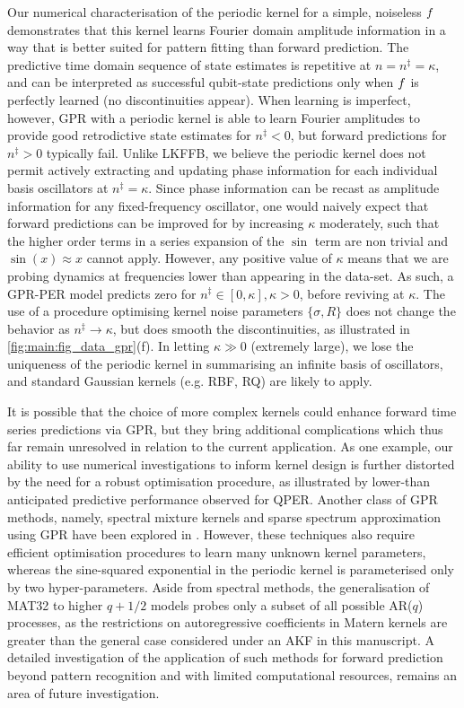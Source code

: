 Our numerical characterisation of the periodic kernel for a simple, noiseless $f$ demonstrates that this kernel learns Fourier domain amplitude information in a way that is better suited for pattern fitting than forward prediction. The predictive time domain sequence of state estimates is repetitive at $ n=n^\ddagger= \kappa$, and can be interpreted as successful qubit-state predictions only when $f$ is perfectly learned (no discontinuities appear). When learning is imperfect, however, GPR with a periodic kernel is able to learn Fourier amplitudes to provide good retrodictive state estimates for $n^\ddagger<0$, but forward predictions for $n^\ddagger>0$ typically fail.  Unlike LKFFB, we believe the periodic kernel does not permit actively extracting and updating phase information for each individual basis oscillators at $n^\ddagger= \kappa$.  Since phase information can be recast as amplitude information for any fixed-frequency oscillator, one would naively expect that forward predictions can be improved for by increasing $\kappa$ moderately, such that the higher order terms in a series expansion of the $\sin$ term are non trivial and $\sin(x)\approx x$ cannot apply. However, any positive value of $\kappa$ means that we are probing dynamics at frequencies lower than appearing in the data-set. As such, a GPR-PER model predicts zero for $n^\ddagger \in [0, \kappa], \kappa > 0$, before reviving at $\kappa$.  The use of a procedure optimising kernel noise parameters $\{\sigma, R\}$ does not change the behavior as $ n^\ddagger \to\kappa$, but does smooth the discontinuities, as illustrated in \cref{fig:main:fig_data_gpr}(f). In letting $\kappa \gg 0$ (extremely large), we lose the uniqueness of the periodic kernel in summarising an infinite basis of oscillators, and standard Gaussian kernels (e.g. RBF, RQ) are likely to apply. 

It is possible that the choice of more complex kernels could enhance forward time series predictions via GPR, but they bring additional complications which thus far remain unresolved in relation to the current application. As one example, our ability to use numerical investigations to inform kernel design is further distorted by the need for a robust optimisation procedure, as illustrated by lower-than anticipated predictive performance observed for QPER.  Another class of GPR methods, namely, spectral mixture kernels and sparse spectrum approximation using GPR have been explored in \cite{wilson2013, quia2010}. However, these techniques also require efficient optimisation procedures to learn many unknown kernel parameters, whereas the sine-squared exponential in the periodic kernel is parameterised only by two hyper-parameters. Aside from spectral methods, the generalisation of MAT32 to higher $q + 1/2$ models probes only a subset of all possible AR($q$) processes, as the restrictions on autoregressive coefficients in Matern kernels are greater than the general case considered under an AKF in this manuscript. A detailed investigation of the application of such methods for forward prediction beyond pattern recognition and with limited computational resources, remains an area of future investigation.


